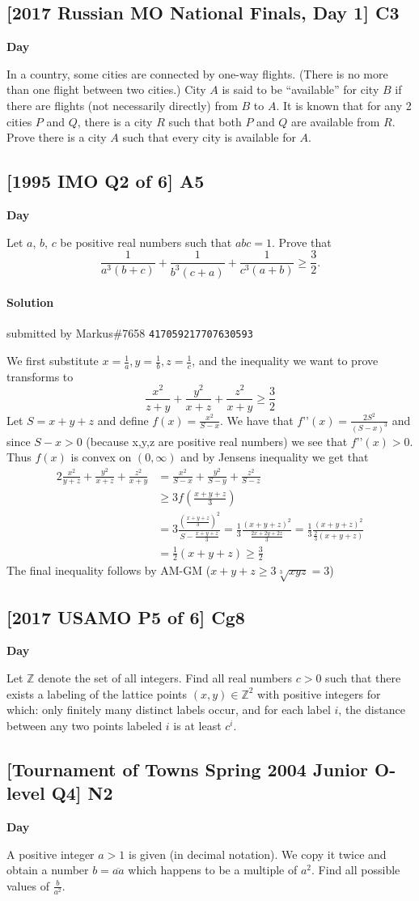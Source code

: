 \documentclass[10pt]{article}
\newcommand{\themonth}{March}
\newcommand{\theyear}{2019}
\newcounter{day}
\newcounter{solution}
\newcounter{datenumber}
\newcommand{\problem}[4][0]{
	\newpage
	\subsection{[#3] \space #2} \hfill 
	{\large\textbf{Day \arabic{day}}} %
	\begin{flushleft} #4 \end{flushleft}
	\vspace{1em}
	\addtocounter{day}{1}
	\addtocounter{datenumber}{1}
	\setcounter{solution}{1}
}
\newcommand{\solution}[4][0]{
	\paragraph{Solution \arabic{solution}} \hfill submitted by #2 \hfill \texttt{#3}
	\begin{flushleft} #4 \end{flushleft}
	\addtocounter{solution}{1}
	\vspace{1em}
}
\begin{document}
\problem[64]{C3}{2017 Russian MO National Finals, Day 1}{In a country, some cities are connected by one-way flights. (There is no more than one flight between two cities.) City \(A\) is said to be ``available'' for city \(B\) if there are flights (not necessarily directly) from \(B\) to \(A\). It is known that for any 2 cities \(P\) and \(Q\), there is a city \(R\) such that both \(P\) and \(Q\) are available from \(R\). Prove there is a city \(A\) such that every city is available for \(A\).}

\problem[65]{A5}{1995 IMO Q2 of 6}{Let $a$, $b$, $c$ be positive real numbers such that $abc=1$. Prove that \[\frac{1}{a^3(b+c)} + \frac{1}{b^3(c+a)} + \frac{1}{c^3(a+b)} \geq \frac{3}{2}.\]}

\solution[65]{Markus\#7658}{417059217707630593}{We first substitute $x=\frac1a, y=\frac1b, z=\frac1c$, and the inequality we want to prove transforms to $$\frac{x^2}{z+y} + \frac{y^2}{x+z} + \frac{z^2}{x+y} \geq \frac32$$ Let $S=x+y+z$ and define $f(x)=\frac{x^2}{S-x}$. We have that $f’’(x)=\frac{2S^2}{(S-x)^3}$ and since $S-x > 0$ (because x,y,z are positive real numbers) we see that $f’’(x)>0$. Thus $f(x)$ is convex on $(0,\infty)$ and by Jensens inequality we get that \begin{alignat*}{2}\frac{x^2}{y+z} + \frac{y^2}{x+z} + \frac{z^2}{x+y} & =\frac{x^2}{S-x} + \frac{y^2}{S-y} + \frac{z^2}{S-z} \\
	&\geq 3f\left(\frac{x+y+z}{3} \right) \\
	&= 3\frac{\left(\frac{x+y+z}{3}\right)^2}{S-\frac{x+y+z}{3}} = \frac{1}{3}\frac{(x+y+z)^2}{\frac{2x+2y+2z}{3}} = \frac13 \frac{(x+y+z)^2}{\frac23 (x+y+z)} \\
	&= \frac12 (x+y+z) \geq \frac32 \end{alignat*}
	The final inequality follows by AM-GM ($x+y+z \geq 3 \sqrt[3]{xyz}=3$)}

\problem[66]{Cg8}{2017 USAMO P5 of 6}{Let \(\mathbb{Z}\) denote the set of all integers. Find all real numbers \(c > 0\) such that there exists a labeling of the lattice points \(( x, y ) \in \mathbb{Z}^2\) with positive integers for which: only finitely many distinct labels occur, and for each label \(i\), the distance between any two points labeled \(i\) is at least \(c^i\).}

\problem[67]{N2}{Tournament of Towns Spring 2004 Junior O-level Q4}{A positive integer $a > 1$ is given (in decimal notation). We copy it twice and obtain a number $b = \overline{aa}$ which happens to be a multiple of $a^2$. Find all possible values of $\frac{b}{a^2}$.}
\end{document}
